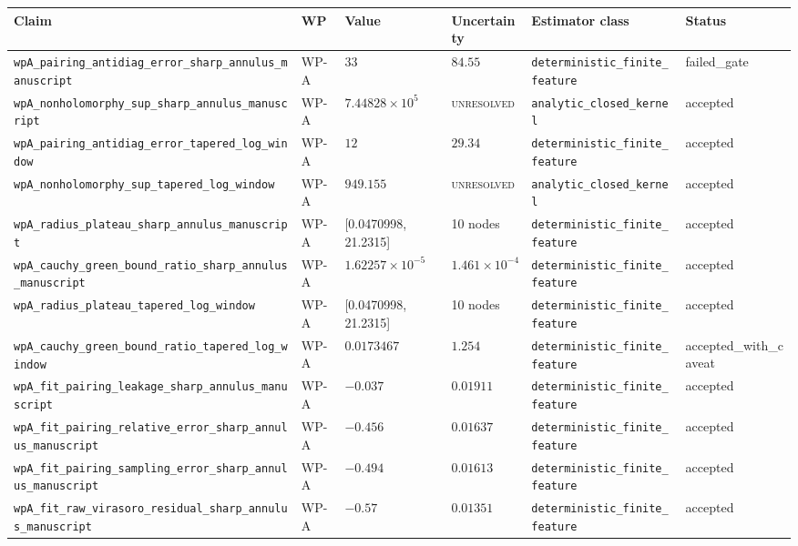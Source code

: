 \begin{table}[t]
\centering\footnotesize
\begin{tabular}{@{}llllll@{}}
\toprule
Claim & WP & Value & Uncertainty & Estimator class & Status \\
\midrule
\texttt{wpA\_pairing\_antidiag\_error\_sharp\_annulus\_manuscript} & WP-A & $33$ & $84.55$ & \texttt{deterministic\_finite\_feature} & failed\_gate \\
\texttt{wpA\_nonholomorphy\_sup\_sharp\_annulus\_manuscript} & WP-A & $7.44828\times10^{5}$ & \textsc{unresolved} & \texttt{analytic\_closed\_kernel} & accepted \\
\texttt{wpA\_pairing\_antidiag\_error\_tapered\_log\_window} & WP-A & $12$ & $29.34$ & \texttt{deterministic\_finite\_feature} & accepted \\
\texttt{wpA\_nonholomorphy\_sup\_tapered\_log\_window} & WP-A & $949.155$ & \textsc{unresolved} & \texttt{analytic\_closed\_kernel} & accepted \\
\texttt{wpA\_radius\_plateau\_sharp\_annulus\_manuscript} & WP-A & [0.0470998, 21.2315] & 10 nodes & \texttt{deterministic\_finite\_feature} & accepted \\
\texttt{wpA\_cauchy\_green\_bound\_ratio\_sharp\_annulus\_manuscript} & WP-A & $1.62257\times10^{-5}$ & $1.461\times10^{-4}$ & \texttt{deterministic\_finite\_feature} & accepted \\
\texttt{wpA\_radius\_plateau\_tapered\_log\_window} & WP-A & [0.0470998, 21.2315] & 10 nodes & \texttt{deterministic\_finite\_feature} & accepted \\
\texttt{wpA\_cauchy\_green\_bound\_ratio\_tapered\_log\_window} & WP-A & $0.0173467$ & $1.254$ & \texttt{deterministic\_finite\_feature} & accepted\_with\_caveat \\
\texttt{wpA\_fit\_pairing\_leakage\_sharp\_annulus\_manuscript} & WP-A & $-0.037$ & $0.01911$ & \texttt{deterministic\_finite\_feature} & accepted \\
\texttt{wpA\_fit\_pairing\_relative\_error\_sharp\_annulus\_manuscript} & WP-A & $-0.456$ & $0.01637$ & \texttt{deterministic\_finite\_feature} & accepted \\
\texttt{wpA\_fit\_pairing\_sampling\_error\_sharp\_annulus\_manuscript} & WP-A & $-0.494$ & $0.01613$ & \texttt{deterministic\_finite\_feature} & accepted \\
\texttt{wpA\_fit\_raw\_virasoro\_residual\_sharp\_annulus\_manuscript} & WP-A & $-0.57$ & $0.01351$ & \texttt{deterministic\_finite\_feature} & accepted \\

\end{tabular}
\end{table}
